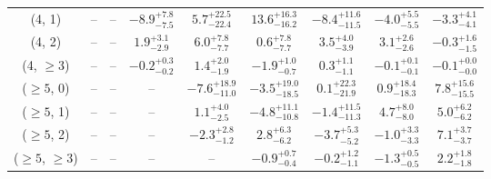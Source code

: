 \begin{table}[h!]
{\begin{tabular}{ccccccccc}
	(4, 1) & -- & -- & $-8.9^{+ 7.8 }_{- 7.5 }$ & $5.7^{+ 22.5 }_{- 22.4 }$ & $13.6^{+ 16.3 }_{- 16.2 }$ & $-8.4^{+ 11.6 }_{- 11.5 }$ & $-4.0^{+ 5.5 }_{- 5.5 }$ & $-3.3^{+ 4.1 }_{- 4.1 }$ \\[0.5ex] 
	(4, 2) & -- & -- & $1.9^{+ 3.1 }_{- 2.9 }$ & $6.0^{+ 7.8 }_{- 7.7 }$ & $0.6^{+ 7.8 }_{- 7.7 }$ & $3.5^{+ 4.0 }_{- 3.9 }$ & $3.1^{+ 2.6 }_{- 2.6 }$ & $-0.3^{+ 1.6 }_{- 1.5 }$ \\[0.5ex] 
	(4, $\ge3$) & -- & -- & $-0.2^{+ 0.3 }_{- 0.2 }$ & $1.4^{+ 2.0 }_{- 1.9 }$ & $-1.9^{+ 1.0 }_{- 0.7 }$ & $0.3^{+ 1.1 }_{- 1.1 }$ & $-0.1^{+ 0.1 }_{- 0.1 }$ & $-0.1^{+ 0.0 }_{- 0.0 }$ \\[0.5ex] 
	($\ge5$, 0) & -- & -- & -- & $-7.6^{+ 18.9 }_{- 11.0 }$ & $-3.5^{+ 19.0 }_{- 18.5 }$ & $0.1^{+ 22.3 }_{- 21.9 }$ & $0.9^{+ 18.4 }_{- 18.3 }$ & $7.8^{+ 15.6 }_{- 15.5 }$ \\[0.5ex] 
	($\ge5$, 1) & -- & -- & -- & $1.1^{+ 4.0 }_{- 2.5 }$ & $-4.8^{+ 11.1 }_{- 10.8 }$ & $-1.4^{+ 11.5 }_{- 11.3 }$ & $4.7^{+ 8.0 }_{- 8.0 }$ & $5.0^{+ 6.2 }_{- 6.2 }$ \\[0.5ex] 
	($\ge5$, 2) & -- & -- & -- & $-2.3^{+ 2.8 }_{- 1.2 }$ & $2.8^{+ 6.3 }_{- 6.2 }$ & $-3.7^{+ 5.3 }_{- 5.2 }$ & $-1.0^{+ 3.3 }_{- 3.3 }$ & $7.1^{+ 3.7 }_{- 3.7 }$ \\[0.5ex] 
	($\ge5$, $\ge3$) & -- & -- & -- & -- & $-0.9^{+ 0.7 }_{- 0.4 }$ & $-0.2^{+ 1.2 }_{- 1.1 }$ & $-1.3^{+ 0.5 }_{- 0.5 }$ & $2.2^{+ 1.8 }_{- 1.8 }$ \\[0.5ex] 
	\hline
	\hline
\end{tabular}}
\end{table}
